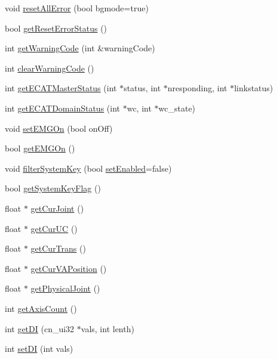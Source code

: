 \begin{DoxyCompactItemize}
void \hyperlink{classCUIApp_a4d7b7d79f9058f4788436b618c5d3f8c}{reset\-All\-Error} (bool bgmode=true)
\item 
bool \hyperlink{classCUIApp_a71f52cfd98a3b974e6e5bb18792022fa}{get\-Reset\-Error\-Status} ()
\item 
int \hyperlink{classCUIApp_af62220023edaab281f7ad32df8c7149d}{get\-Warning\-Code} (int \&warning\-Code)
\item 
int \hyperlink{classCUIApp_a65fd5f0b44938f9fd50b7ffa95beb2f3}{clear\-Warning\-Code} ()
\item 
int \hyperlink{classCUIApp_abb8769af70015d3d55aa180df9783c9b}{get\-E\-C\-A\-T\-Master\-Status} (int $\ast$status, int $\ast$nresponding, int $\ast$linkstatus)
\item 
int \hyperlink{classCUIApp_a80553db100390f6a3cba662ba79f0011}{get\-E\-C\-A\-T\-Domain\-Status} (int $\ast$wc, int $\ast$wc\-\_\-state)
\item 
void \hyperlink{classCUIApp_a16723ff044ecfcc4eac46f1190490261}{set\-E\-M\-G\-On} (bool on\-Off)
\item 
bool \hyperlink{classCUIApp_a37ba11617d17bd7876e678ad1a23080f}{get\-E\-M\-G\-On} ()
\item 
void \hyperlink{classCUIApp_ab08c13cf86c8600d6355a4b82d0d44cc}{filter\-System\-Key} (bool \hyperlink{classCUIApp_a0bb9aaecc950f991d3ecc69e5895e9e6}{set\-Enabled}=false)
\item 
bool \hyperlink{classCUIApp_a3929465084f3838bdcb958fffb3d6ee3}{get\-System\-Key\-Flag} ()
\item 
float $\ast$ \hyperlink{classCUIApp_a3044e8082b57b131955349a9e59d1341}{get\-Cur\-Joint} ()
\item 
float $\ast$ \hyperlink{classCUIApp_ad51349f53d180797ac563eee94b14305}{get\-Cur\-U\-C} ()
\item 
float $\ast$ \hyperlink{classCUIApp_a3644d18cbd1ba30478da55a8c36d759e}{get\-Cur\-Trans} ()
\item 
float $\ast$ \hyperlink{classCUIApp_a1d7f8fbb63c50f39d49a7b74b8df41e6}{get\-Cur\-V\-A\-Position} ()
\item 
float $\ast$ \hyperlink{classCUIApp_a6b09f14f5945d44728c84e4717a95aa6}{get\-Physical\-Joint} ()
\item 
int \hyperlink{classCUIApp_a01e8913a5caef79b31a1ca5f5473d406}{get\-Axis\-Count} ()
\item 
int \hyperlink{classCUIApp_add27a97e06315b685aabb293b4e9652f}{get\-D\-I} (cn\-\_\-ui32 $\ast$vals, int lenth)
\item 
int \hyperlink{classCUIApp_aa663db4584639c16d6fad80199d7b548}{set\-D\-I} (int vals)

\end{DoxyCompactItemize}
